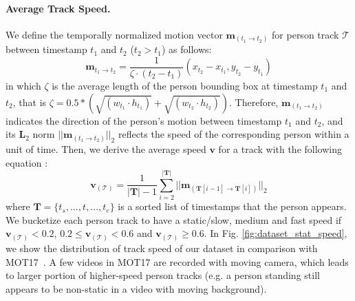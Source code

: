 \documentclass[runningheads]{llncs}
\begin{document}
\paragraph{\textbf{Average Track Speed.}}
We define the temporally normalized motion vector $\mathbf{m}_{(t_1 \rightarrow t_2)}$ for person track $\mathcal{T}$ between timestamp $t_1$ and $t_2$ ($t_2 > t_1$) as follows:
\begin{equation}
    \mathbf{m}_{t_1 \rightarrow t_2} = \frac{1}{\zeta \!\! \cdot \!\! (t_2 - t_1)} (x_{t_2} - x_{t_1}, y_{t_2} - y_{t_1})
\end{equation}
in which $\zeta$ is the average length 
of the person bounding box at timestamp $t_1$ and $t_2$, that is $\zeta = 0.5 * (\sqrt{(w_{t_1} \! \cdot \! h_{t_1})} + \sqrt{(w_{t_2} \! \cdot \! h_{t_2})})$. Therefore, $\mathbf{m}_{(t_1 \rightarrow t_2)}$ indicates the direction of the person's motion between timestamp $t_1$ and $t_2$, and its $\mathbf{L}_2$ norm $||\mathbf{m}_{(t_1 \rightarrow t_2)}||_2$ reflects the speed of the corresponding person within a unit of time. Then, we derive the average speed $\mathbf{v}$ for a track with the following equation
:
\begin{equation}
    \mathbf{v}_{(\mathcal{T})} = \frac{1}{|\mathbf{T}|-1}\sum_{i=2}^{|\mathbf{T}|} ||\mathbf{m}_{(\mathbf{T}[i-1] \rightarrow \mathbf{T}[i])}||_2
\end{equation}
where $\mathbf{T} = \{t_s, \ldots, t, \ldots, t_e\}$ is a sorted list of timestamps that the person appears. We bucketize each person track to have a static/slow, medium and fast speed if $\mathbf{v}_{(\mathcal{T})} < 0.2$, $0.2 \leq \mathbf{v}_{(\mathcal{T})} < 0.6$ and $\mathbf{v}_{(\mathcal{T})} \geq 0.6$. In Fig. \ref{fig:dataset_stat_speed}, we show the distribution of track speed of our dataset in comparison with MOT17~\cite{mot}. A few videos in MOT17 are recorded with moving camera, which leads to larger portion of higher-speed person tracks (e.g. a person standing still appears to be non-static in a video with moving background). 
\end{document}
